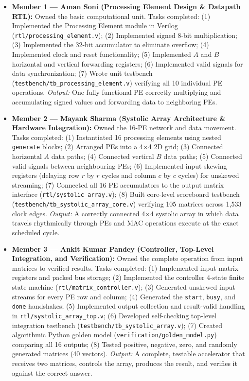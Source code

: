 \documentclass[conference]{IEEEtran}
\begin{document}
\begin{itemize}
    \item \textbf{Member 1 --- Aman Soni (Processing Element Design \& Datapath RTL):}
    Owned the basic computational unit. Tasks completed:
    (1) Implemented the Processing Element module in Verilog (\texttt{rtl/processing\_element.v});
    (2) Implemented signed 8-bit multiplication;
    (3) Implemented the 32-bit accumulator to eliminate overflow;
    (4) Implemented clock and reset functionality;
    (5) Implemented $A$ and $B$ horizontal and vertical forwarding registers;
    (6) Implemented valid signals for data synchronization;
    (7) Wrote unit testbench (\texttt{testbench/tb\_processing\_element.v}) verifying all 10 individual PE operations.
    \textit{Output:} One fully functional PE correctly multiplying and accumulating signed values and forwarding data to neighboring PEs.

    \item \textbf{Member 2 --- Mayank Sharma (Systolic Array Architecture \& Hardware Integration):}
    Owned the 16-PE network and data movement. Tasks completed:
    (1) Instantiated 16 processing elements using nested \texttt{generate} blocks;
    (2) Arranged PEs into a 4$\times$4 2D grid;
    (3) Connected horizontal $A$ data paths;
    (4) Connected vertical $B$ data paths;
    (5) Connected valid signals between neighbouring PEs;
    (6) Implemented input skewing registers (delaying row $r$ by $r$ cycles and column $c$ by $c$ cycles) for unskewed streaming;
    (7) Connected all 16 PE accumulators to the output matrix interface (\texttt{rtl/systolic\_array.v});
    (8) Built core-level scoreboard testbench (\texttt{testbench/tb\_systolic\_array\_core.v}) verifying 105 matrices across 1,533 clock edges.
    \textit{Output:} A correctly connected 4$\times$4 systolic array in which data travels rhythmically through PEs and MAC operations execute at the exact scheduled cycle.

    \item \textbf{Member 3 --- Ankit Kumar Pandey (Controller, Top-Level Integration, and Verification):}
    Owned the complete operation from input matrices to verified results. Tasks completed:
    (1) Implemented input matrix registers and packed bus storage;
    (2) Implemented the controller 4-state finite state machine (\texttt{rtl/matrix\_controller.v});
    (3) Generated unskewed input streams for every PE row and column;
    (4) Generated the \texttt{start}, \texttt{busy}, and \texttt{done} handshakes;
    (5) Implemented output collection and result-valid handling in \texttt{rtl/systolic\_array\_top.v};
    (6) Developed self-checking top-level integration testbench (\texttt{testbench/tb\_systolic\_array.v});
    (7) Created algorithmic Python golden model (\texttt{verification/golden\_model.py}) comparing all 16 outputs;
    (8) Tested positive, negative, zero, and randomly generated matrices (40 vectors).
    \textit{Output:} A complete, testable accelerator that receives two matrices, controls the array, produces the result, and verifies it against the correct answer.
\end{itemize}
\end{document}
